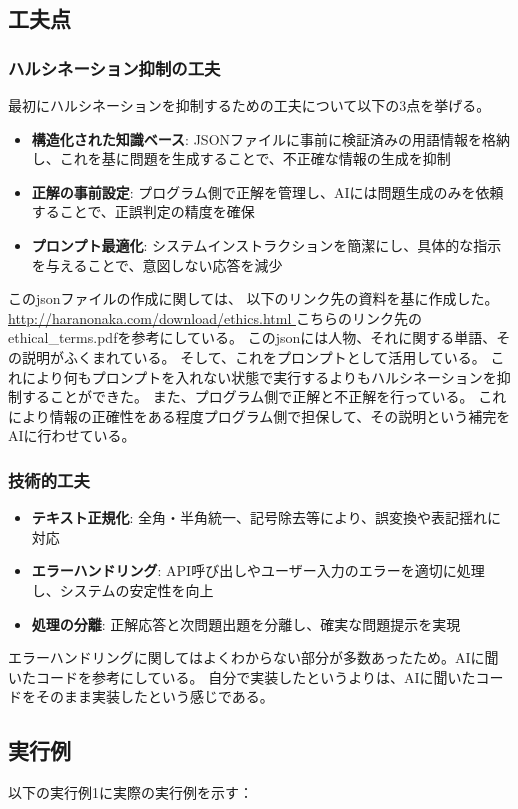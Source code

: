 \documentclass[a4paper,11pt]{ltjsarticle}
\begin{document}
\subsection{工夫点}
\subsubsection{ハルシネーション抑制の工夫}
最初にハルシネーションを抑制するための工夫について以下の3点を挙げる。
\begin{itemize}
\item \textbf{構造化された知識ベース}: JSONファイルに事前に検証済みの用語情報を格納し、これを基に問題を生成することで、不正確な情報の生成を抑制
\item \textbf{正解の事前設定}: プログラム側で正解を管理し、AIには問題生成のみを依頼することで、正誤判定の精度を確保
\item \textbf{プロンプト最適化}: システムインストラクションを簡潔にし、具体的な指示を与えることで、意図しない応答を減少
\end{itemize}
このjsonファイルの作成に関しては、
以下のリンク先の資料を基に作成した。
\url{
  http://haranonaka.com/download/ethics.html
}
こちらのリンク先のethical\_terms.pdfを参考にしている。
このjsonには人物、それに関する単語、その説明がふくまれている。
そして、これをプロンプトとして活用している。
これにより何もプロンプトを入れない状態で実行するよりもハルシネーションを抑制することができた。
また、プログラム側で正解と不正解を行っている。
これにより情報の正確性をある程度プログラム側で担保して、その説明という補完をAIに行わせている。

\subsubsection{技術的工夫}
\begin{itemize}
\item \textbf{テキスト正規化}: 全角・半角統一、記号除去等により、誤変換や表記揺れに対応
\item \textbf{エラーハンドリング}: API呼び出しやユーザー入力のエラーを適切に処理し、システムの安定性を向上
\item \textbf{処理の分離}: 正解応答と次問題出題を分離し、確実な問題提示を実現
\end{itemize}
エラーハンドリングに関してはよくわからない部分が多数あったため。AIに聞いたコードを参考にしている。
自分で実装したというよりは、AIに聞いたコードをそのまま実装したという感じである。
\subsection{実行例}
以下の実行例1に実際の実行例を示す：
\end{document}
